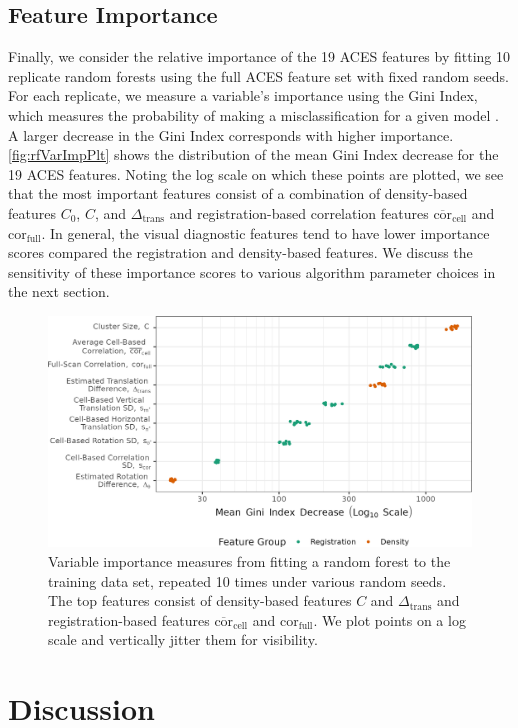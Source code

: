 \documentclass[reprint]{JASA}
\begin{document}
\hypertarget{feature-importance}{%
\subsection{Feature Importance}\label{feature-importance}}

Finally, we consider the relative importance of the 19 ACES features by
fitting 10 replicate random forests using the full ACES feature set with
fixed random seeds. For each replicate, we measure a variable's
importance using the Gini Index, which measures the probability of
making a misclassification for a given model
\citep{hastie_elements_2008}. A larger decrease in the Gini Index
corresponds with higher importance. \autoref{fig:rfVarImpPlt} shows the
distribution of the mean Gini Index decrease for the 19 ACES features.
Noting the log scale on which these points are plotted, we see that the
most important features consist of a combination of density-based
features \(C_0\), \(C\), and \(\Delta_{\text{trans}}\) and
registration-based correlation features
\(\overline{\text{cor}}_{\text{cell}}\) and
\(\text{cor}_{\text{full}}\). In general, the visual diagnostic features
tend to have lower importance scores compared the registration and
density-based features. We discuss the sensitivity of these importance
scores to various algorithm parameter choices in the next section.

\begin{figure}[htbp]
\includegraphics[width=.5\textwidth]{images/resultsPlots/varImpPlt} \caption{\label{fig:rfVarImpPlt} Variable importance measures from fitting a random forest to the training data set, repeated 10 times under various random seeds. The top features consist of  density-based features $C$ and $\Delta_{\text{trans}}$ and registration-based features $\overline{\text{cor}}_{\text{cell}}$ and $\text{cor}_{\text{full}}$. We plot points on a log scale and vertically jitter them for visibility.}\label{fig:unnamed-chunk-12}
\end{figure}

\hypertarget{discussion}{%
\section{Discussion}\label{discussion}}
\end{document}
